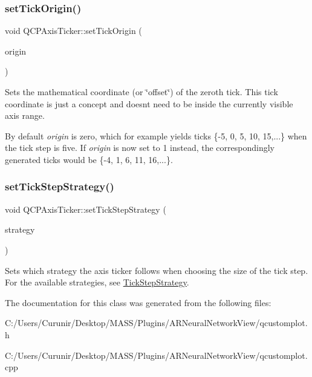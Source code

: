 \subsubsection{\texorpdfstring{set\+Tick\+Origin()}{setTickOrigin()}}
{\footnotesize\ttfamily void Q\+C\+P\+Axis\+Ticker\+::set\+Tick\+Origin (\begin{DoxyParamCaption}\item[{double}]{origin }\end{DoxyParamCaption})}

Sets the mathematical coordinate (or \char`\"{}offset\char`\"{}) of the zeroth tick. This tick coordinate is just a concept and doesn\textquotesingle{}t need to be inside the currently visible axis range.

By default {\itshape origin} is zero, which for example yields ticks \{-\/5, 0, 5, 10, 15,...\} when the tick step is five. If {\itshape origin} is now set to 1 instead, the correspondingly generated ticks would be \{-\/4, 1, 6, 11, 16,...\}. \mbox{\label{class_q_c_p_axis_ticker_a73b1d847c1a12159af6bfda4ebebe7d5}} 
\subsubsection{\texorpdfstring{set\+Tick\+Step\+Strategy()}{setTickStepStrategy()}}
{\footnotesize\ttfamily void Q\+C\+P\+Axis\+Ticker\+::set\+Tick\+Step\+Strategy (\begin{DoxyParamCaption}\item[{\hyperlink{class_q_c_p_axis_ticker_ab6d2f9d9477821623ac9bc4b21ddf49a}{Q\+C\+P\+Axis\+Ticker\+::\+Tick\+Step\+Strategy}}]{strategy }\end{DoxyParamCaption})}

Sets which strategy the axis ticker follows when choosing the size of the tick step. For the available strategies, see \hyperlink{class_q_c_p_axis_ticker_ab6d2f9d9477821623ac9bc4b21ddf49a}{Tick\+Step\+Strategy}. 

The documentation for this class was generated from the following files\+:\begin{DoxyCompactItemize}
\item 
C\+:/\+Users/\+Curunir/\+Desktop/\+M\+A\+S\+S/\+Plugins/\+A\+R\+Neural\+Network\+View/qcustomplot.\+h\item 
C\+:/\+Users/\+Curunir/\+Desktop/\+M\+A\+S\+S/\+Plugins/\+A\+R\+Neural\+Network\+View/qcustomplot.\+cpp\end{DoxyCompactItemize}
